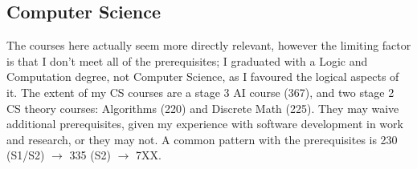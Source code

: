 \documentclass[10pt,a4paper]{article}
\begin{document}
\subsection{Computer Science}
\label{sec:computer-science}

The courses here actually seem more directly relevant, however the limiting factor is that I don't meet all of the prerequisites; I graduated with a Logic and Computation degree, not Computer Science, as I favoured the logical aspects of it. The extent of my CS courses are a stage 3 AI course (367), and two stage 2 CS theory courses: Algorithms (220) and Discrete Math (225). They may waive additional prerequisites, given my experience with software development in work and research, or they may not. A common pattern with the prerequisites is 230 (S1/S2) \(\to\) 335 (S2) \(\to\) 7XX.
\end{document}
